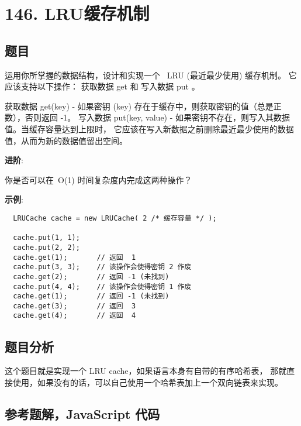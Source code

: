 \newpage
\section{146. LRU缓存机制}
\label{leetcode:146}

\subsection{题目}

运用你所掌握的数据结构，设计和实现一个  LRU (最近最少使用) 缓存机制。
它应该支持以下操作： 获取数据 get 和 写入数据 put 。

获取数据 get(key) - 如果密钥 (key) 存在于缓存中，则获取密钥的值（总是正数），否则返回 -1。
写入数据 put(key, value) - 如果密钥不存在，则写入其数据值。当缓存容量达到上限时，
它应该在写入新数据之前删除最近最少使用的数据值，从而为新的数据值留出空间。

\textbf{进阶}:

你是否可以在 O(1) 时间复杂度内完成这两种操作？

\textbf{示例}:

\begin{verbatim}
  LRUCache cache = new LRUCache( 2 /* 缓存容量 */ );

  cache.put(1, 1);
  cache.put(2, 2);
  cache.get(1);       // 返回  1
  cache.put(3, 3);    // 该操作会使得密钥 2 作废
  cache.get(2);       // 返回 -1 (未找到)
  cache.put(4, 4);    // 该操作会使得密钥 1 作废
  cache.get(1);       // 返回 -1 (未找到)
  cache.get(3);       // 返回  3
  cache.get(4);       // 返回  4
\end{verbatim}

\subsection{题目分析}

这个题目就是实现一个 LRU cache，如果语言本身有自带的有序哈希表，
那就直接使用，如果没有的话，可以自己使用一个哈希表加上一个双向链表来实现。

\subsection{参考题解，JavaScript 代码}

